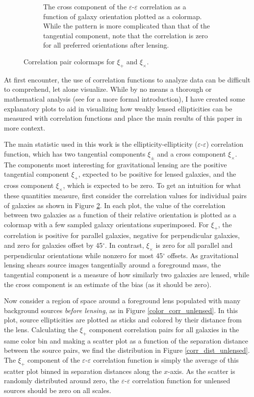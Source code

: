 \documentclass[%
 reprint,
 amsmath,amssymb,
 aps,nofootinbib
]{revtex4-1}
\begin{document}
\begin{figure}[!b]
\begin{subfigure}{0.425\textwidth}
        \captionsetup{justification=raggedright,singlelinecheck=false}
        \caption{The cross component of the $\varepsilon$-$\varepsilon$ correlation as a function of galaxy orientation plotted as a colormap. While the pattern is more complicated than that of the tangential component, note that the correlation is zero for all preferred orientations after lensing.}
        \label{xix_colormap}
    \end{subfigure}
    \caption{Correlation pair colormaps for $\xi_+$ and $\xi_\times$.}
    \label{corr_colormaps}
\end{figure}

At first encounter, the use of correlation functions to analyze data can be difficult to comprehend, let alone visualize. While by no means a thorough or mathematical analysis (see \cite{correlation_functions} for a more formal introduction), I have created some explanatory plots to aid in visualizing how weakly lensed ellipticities can be measured with correlation functions and place the main results of this paper in more context.

The main statistic used in this work is the ellipticity-ellipticity ($\varepsilon$-$\varepsilon$) correlation function, which has two tangential components $\xi_\pm$ and a cross component $\xi_\times$. The components most interesting for gravitational lensing are the positive tangential component $\xi_+$, expected to be positive for lensed galaxies, and the cross component $\xi_\times$, which is expected to be zero. To get an intuition for what these quantities measure, first consider the correlation values for individual pairs of galaxies as shown in Figure \ref{corr_colormaps}. In each plot, the value of the correlation between two galaxies as a function of their relative orientation is plotted as a colormap with a few sampled galaxy orientations superimposed. For $\xi_+$, the correlation is positive for parallel galaxies, negative for perpendicular galaxies, and zero for galaxies offset by 45$^\circ$. In contrast, $\xi_\times$ is zero for all parallel and perpendicular orientations while nonzero for most 45$^\circ$ offsets. As gravitational lensing shears source images tangentially around a foreground mass, the tangential component is a measure of how similarly two galaxies are lensed, while the cross component is an estimate of the bias (as it should be zero).

Now consider a region of space around a foreground lens populated with many background sources \textit{before lensing}, as in Figure \ref{color_corr_unlensed}. In this plot, source ellipticities are plotted as sticks and colored by their distance from the lens. Calculating the $\xi_+$ component correlation pairs for all galaxies in the same color bin and making a scatter plot as a function of the separation distance between the source pairs, we find the distribution in Figure \ref{corr_dist_unlensed}. The $\xi_+$ component of the $\varepsilon$-$\varepsilon$ correlation function is simply the average of this scatter plot binned in separation distances along the $x$-axis. As the scatter is randomly distributed around zero, the $\varepsilon$-$\varepsilon$ correlation function for unlensed sources should be zero on all scales.
\end{document}
